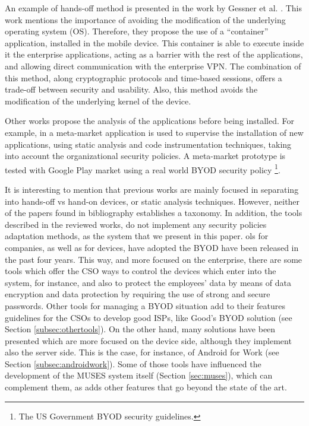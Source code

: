 An example of hands-off method is presented in the work by Gessner et al. \cite{Gessner13userfriendly}. This work mentions the importance of avoiding the modification of the underlying operating system (OS). Therefore, they propose the use of a ``container'' application, installed in the mobile device. This container is able to execute inside it the enterprise applications, acting as a barrier with the rest of the applications, and allowing direct communication with the enterprise VPN. The combination of this method, along cryptographic protocols and time-based sessions, offers a trade-off between security and usability. Also, this method avoids the modification of the underlying kernel of the device.

Other works propose the analysis of the applications before being installed. For example, in \cite{Armando14metamarket} a meta-market application is used to supervise the installation of new applications, using static analysis and code instrumentation techniques, taking into account the organizational security policies. A meta-market prototype is tested with Google Play market using a real world BYOD security policy \footnote{The US Government BYOD security guidelines.}.

It is interesting to mention that previous works are mainly focused in separating into hands-off vs hand-on devices, or static analysis techniques. However, neither of the papers found in bibliography establishes a taxonomy. In addition, the tools described in the reviewed works, do not implement any security policies adaptation methods, as the system that we present in this paper.
ols for companies, as well as for devices, have adopted the BYOD have been released in the past four years. This way, and more focused on the enterprise, there are some tools which offer the CSO ways to control the devices which enter into the system, for instance, and also to protect the employees' data by means of data encryption and data protection by requiring the use of strong and secure passwords. Other tools for managing a BYOD situation add to their features guidelines for the CSOs to develop good ISPs, like Good's BYOD solution (see Section \ref{subsec:othertools}). On the other hand, many solutions have been presented which are more focused on the device side, although they implement also the server side. This is the case, for instance, of Android for Work (see Section \ref{subsec:androidwork}). Some of those tools have influenced the development of the MUSES system  itself (Section \ref{sec:muses}), which can complement them, as adds other features that go beyond the state of the art.

